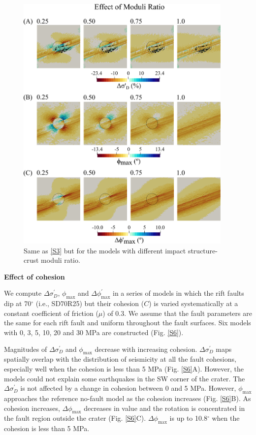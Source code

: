 \documentclass[draft,jgrga]{agutexSI2019}
\begin{document}
\begin{article}
\begin{figure}[ht]
\includegraphics[width=25pc]{Figures/effect_of_moduli_ratio.png}
\caption{Same as \ref{S3} but for the models with different impact structure-crust moduli ratio.}
\label{S5}
\end{figure}

\vspace{10mm} %

\noindent\textbf{Effect of cohesion}

We compute $\Delta \sigma_{D}^{\prime}$, $\phi_{\max}$ and $\Delta \phi_{\max}^{\prime}$ in a series of models in which the rift faults dip at 70$^{\circ}$ (i.e., SD70R25) but their cohesion ($C$) is varied systematically at a constant coefficient of friction ($\mu$) of 0.3. We assume that the fault parameters are the same for each rift fault and uniform throughout the fault surfaces. Six models with 0, 3, 5, 10, 20 and 30 MPa are constructed (Fig. \ref{S6}).

Magnitudes of $\Delta\sigma_D^{\prime}$ and $\phi_{\max}$ decrease with increasing cohesion. $\Delta\sigma_D^{\prime}$ maps spatially overlap with the distribution of seismicity at all the fault cohesions, especially well when the cohesion is less than 5 MPa (Fig. \ref{S6}A). However, the models could not explain some earthquakes in the SW corner of the crater. The $\Delta\sigma_D^{\prime}$ is not affected by a change in cohesion between 0 and 5 MPa. However, $\phi_{\max}$ approaches the reference no-fault model as the cohesion increases (Fig. \ref{S6}B). As cohesion increases, $\Delta\phi_{\max}$ decreases in value and the rotation is concentrated in the fault region outside the crater (Fig. \ref{S6}C). $\Delta\phi_{\max}$ is up to 10.8$^\circ$ when the cohesion is less than 5 MPa. 


\end{article}
\end{document}
